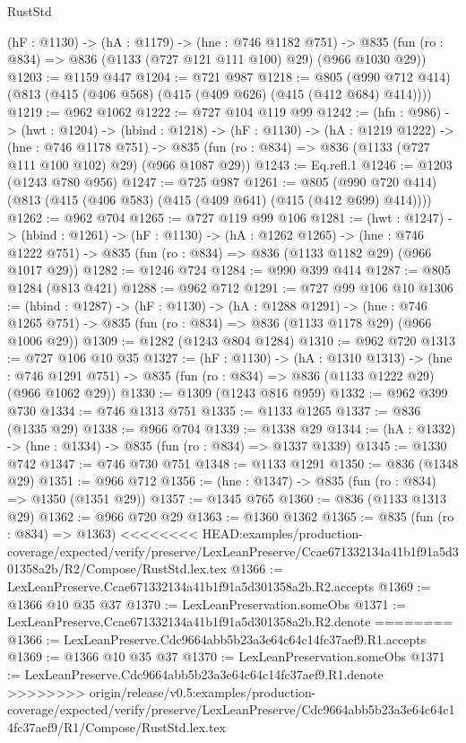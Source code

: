 \begin{lexlean}{RustStd}
\begin{coremodule}
{\begin{coremodule}
  (hF : @1130) ->
  (hA : @1179) ->
  (hne : @746 @1182 @751) ->
  @835 (fun (ro : @834) => @836 (@1133 (@727 @121 @111 @100) @29) (@966 @1030 @29))
@1203 := @1159 @447
@1204 := @721 @987
@1218 := @805 (@990 @712 @414) (@813 (@415 (@406 @568) (@415 (@409 @626) (@415 (@412 @684) @414))))
@1219 := @962 @1062
@1222 := @727 @104 @119 @99
@1242 := (hfn : @986) ->
  (hwt : @1204) ->
  (hbind : @1218) ->
  (hF : @1130) ->
  (hA : @1219 @1222) ->
  (hne : @746 @1178 @751) ->
  @835 (fun (ro : @834) => @836 (@1133 (@727 @111 @100 @102) @29) (@966 @1087 @29))
@1243 := Eq.refl.{1}
@1246 := @1203 (@1243 @780 @956)
@1247 := @725 @987
@1261 := @805 (@990 @720 @414) (@813 (@415 (@406 @583) (@415 (@409 @641) (@415 (@412 @699) @414))))
@1262 := @962 @704
@1265 := @727 @119 @99 @106
@1281 := (hwt : @1247) ->
  (hbind : @1261) ->
  (hF : @1130) ->
  (hA : @1262 @1265) ->
  (hne : @746 @1222 @751) -> @835 (fun (ro : @834) => @836 (@1133 @1182 @29) (@966 @1017 @29))
@1282 := @1246 @724
@1284 := @990 @399 @414
@1287 := @805 @1284 (@813 @421)
@1288 := @962 @712
@1291 := @727 @99 @106 @10
@1306 := (hbind : @1287) ->
  (hF : @1130) ->
  (hA : @1288 @1291) ->
  (hne : @746 @1265 @751) -> @835 (fun (ro : @834) => @836 (@1133 @1178 @29) (@966 @1006 @29))
@1309 := @1282 (@1243 @804 @1284)
@1310 := @962 @720
@1313 := @727 @106 @10 @35
@1327 := (hF : @1130) ->
  (hA : @1310 @1313) ->
  (hne : @746 @1291 @751) -> @835 (fun (ro : @834) => @836 (@1133 @1222 @29) (@966 @1062 @29))
@1330 := @1309 (@1243 @816 @959)
@1332 := @962 @399 @730
@1334 := @746 @1313 @751
@1335 := @1133 @1265
@1337 := @836 (@1335 @29)
@1338 := @966 @704
@1339 := @1338 @29
@1344 := (hA : @1332) -> (hne : @1334) -> @835 (fun (ro : @834) => @1337 @1339)
@1345 := @1330 @742
@1347 := @746 @730 @751
@1348 := @1133 @1291
@1350 := @836 (@1348 @29)
@1351 := @966 @712
@1356 := (hne : @1347) -> @835 (fun (ro : @834) => @1350 (@1351 @29))
@1357 := @1345 @765
@1360 := @836 (@1133 @1313 @29)
@1362 := @966 @720 @29
@1363 := @1360 @1362
@1365 := @835 (fun (ro : @834) => @1363)
<<<<<<<< HEAD:examples/production-coverage/expected/verify/preserve/LexLeanPreserve/Ccae671332134a41b1f91a5d301358a2b/R2/Compose/RustStd.lex.tex
@1366 := LexLeanPreserve.Ccae671332134a41b1f91a5d301358a2b.R2.accepts
@1369 := @1366 @10 @35 @37
@1370 := LexLeanPreservation.someObs
@1371 := LexLeanPreserve.Ccae671332134a41b1f91a5d301358a2b.R2.denote
========
@1366 := LexLeanPreserve.Cdc9664abb5b23a3e64c64c14fc37aef9.R1.accepts
@1369 := @1366 @10 @35 @37
@1370 := LexLeanPreservation.someObs
@1371 := LexLeanPreserve.Cdc9664abb5b23a3e64c64c14fc37aef9.R1.denote
>>>>>>>> origin/release/v0.5:examples/production-coverage/expected/verify/preserve/LexLeanPreserve/Cdc9664abb5b23a3e64c64c14fc37aef9/R1/Compose/RustStd.lex.tex

\end{coremodule}}
\end{coremodule}
\end{lexlean}
